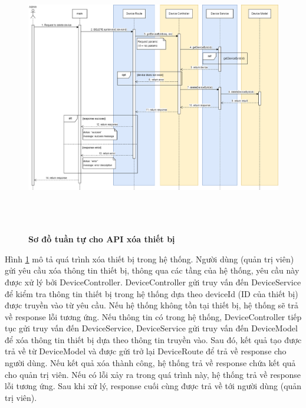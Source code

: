  \begin{figure}[H]
  \centering
  \includegraphics[width=16cm,height=12cm]{Images/sequence_api/deleteDeviceById.png}
  \caption[Sơ đồ tuần tự cho API xóa thiết bị]{\bfseries \fontsize{12pt}{0pt}
  \selectfont Sơ đồ tuần tự cho API xóa thiết bị }
  \label{deleteDeviceById} %
\end{figure}
Hình \ref{deleteDeviceById} mô tả quá trình xóa thiết bị trong hệ thống. Người dùng (quản trị viên) gửi yêu cầu xóa thông tin thiết bị, thông qua các tầng của hệ thống, 
yêu cầu này được xử lý bởi DeviceController. DeviceController gửi truy vấn đến DeviceService để kiểm tra thông tin thiết bị trong hệ thống dựa theo deviceId (ID của thiết bị) được truyền vào từ yêu cầu. 
Nếu hệ thống không tồn tại thiết bị, hệ thống sẽ trả về response lỗi tương ứng. Nếu thông tin có trong hệ thống, DeviceController tiếp tục gửi truy vấn đến DeviceService, DeviceService gửi truy vấn đến DeviceModel để xóa thông tin thiết bị 
dựa theo thông tin truyền vào. Sau đó, kết quả tạo được trả về từ DeviceModel và được gửi trở lại DeviceRoute để trả về response cho người dùng. Nếu kết quả xóa thành công, hệ thống trả về response chứa kết quả cho quản trị viên. 
Nếu có lỗi xảy ra trong quá trình này, hệ thống trả về response lỗi tương ứng. Sau khi xử lý, response cuối cùng được trả về tới người dùng (quản trị viên).


